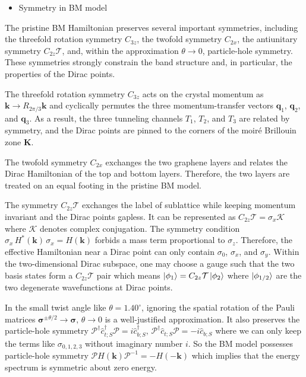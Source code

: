 \documentclass[10pt, oneside]{article}
\newcommand{\te}{\theta}
\newcommand{\p}[1]{\left(#1\right)}
\begin{document}
\begin{itemize}
	\item Symmetry in BM model
\end{itemize}

The pristine BM Hamiltonian preserves several important symmetries, including the threefold rotation symmetry \(C_{3z}\), the twofold symmetry \(C_{2x}\), the antiunitary symmetry \(C_{2z}\mathcal{T}\), and, within the approximation \(\te \rightarrow 0\), particle-hole symmetry. These symmetries strongly constrain the band structure and, in particular, the properties of the Dirac points.

The threefold rotation symmetry \(C_{3z}\) acts on the crystal momentum as \(\bm{k} \rightarrow R_{2\pi/3}\bm{k}\) and cyclically permutes the three momentum-transfer vectors \(\bm q_1\), \(\bm q_2\), and \(\bm q_3\). As a result, the three tunneling channels \(T_1\), \(T_2\), and \(T_3\) are related by symmetry, and the Dirac points are pinned to the corners of the moir\'e Brillouin zone \(\bm{K}\).

The twofold symmetry \(C_{2x}\) exchanges the two graphene layers and relates the Dirac Hamiltonian of the top and bottom layers. Therefore, the two layers are treated on an equal footing in the pristine BM model.

The symmetry \(C_{2z}\mathcal{T}\) exchanges the label of sublattice while keeping momentum invariant and the Dirac points gapless. It can be represented as \(C_{2z}\mathcal{T} = \sigma_x \mathcal{K}\) where \(\mathcal{K}\) denotes complex conjugation. The symmetry condition \(\sigma_x \, H^{*}\p{\bm{k}}\, \sigma_{x} = H(\bm{k})\) forbids a mass term proportional to \(\sigma_z\). Therefore, the effective Hamiltonian near a Dirac point can only contain \(\sigma_0\), \(\sigma_x\), and \(\sigma_y\). Within the two-dimensional Dirac subspace, one may choose a gauge such that the two basis states form a \(C_{2z}\mathcal T\) pair which means \(\ket{\phi_1} = C_{2z} \mathcal{T} \ket{\phi_2}\) where \(\ket{\phi_{1/2}}\) are the two degenerate wavefunctions at Dirac points.


In the small twist angle like \(\te = 1.40^{\circ}\), ignoring the spatial rotation of the Pauli matrices \(\bm{\sigma}^{\pm \te/2} \rightarrow \bm{\sigma},\, \te \rightarrow 0\) is a well-justified approximation. It also preserves the particle-hole symmetry \(\mathcal{P}^{\dagger} \hat{c}^{\dagger}_{t;S} \mathcal{P} = i \hat{c}^{\dagger}_{b;S},\, \mathcal{P}^{\dagger} \hat{c}_{t;S} \mathcal{P} = - i \hat{c}_{b;S}\) where we can only keep the terms like \(\sigma_{0,1,2,3}\) without imaginary number \(i\). So the BM model possesses particle-hole symmetry \(\mathcal{P} H(\bm{k}) \mathcal{P}^{-1} = - H(-\bm{k})\) which implies that the energy spectrum is symmetric about zero energy.
\end{document}
